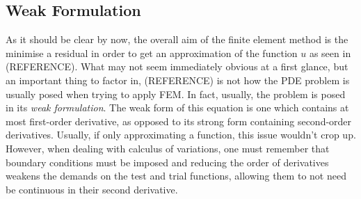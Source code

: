 \subsection{Weak Formulation}
As it should be clear by now, the overall aim of the finite element method is the minimise a residual in order to get an approximation of the function $u$ as seen in (REFERENCE). What may not seem immediately obvious at a first glance, but an important thing to factor in, (REFERENCE) is not how the PDE problem is usually posed when trying to apply FEM. In fact, usually, the problem is posed in its \textit{weak formulation}. The weak form of this equation is one which contains at most first-order derivative, as opposed to its strong form containing second-order derivatives. Usually, if only approximating a function, this issue wouldn't crop up. However, when dealing with calculus of variations, one must remember that boundary conditions must be imposed and reducing the order of derivatives weakens the demands on the test and trial functions, allowing them to not need be continuous in their second derivative.


